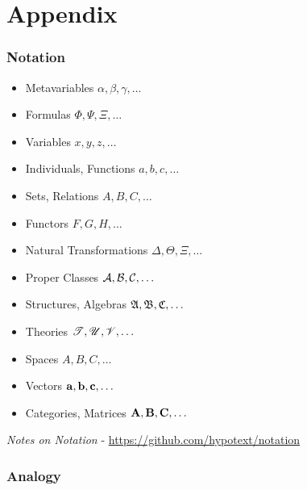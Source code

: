\part{Appendix}\label{part:appendix}

\section{Notation}\label{sec:notation}

\begin{itemize}
  \item Metavariables $\alpha, \beta, \gamma, \ldots$
  \item Formulas $\Phi, \Psi, \Xi, \ldots$
  \item Variables $x, y, z, \ldots$
  \item Individuals, Functions $a, b, c, \ldots$
  \item Sets, Relations $A, B, C, \ldots$
  \item Functors $F, G, H, \ldots$
  \item Natural Transformations $\Delta, \Theta, \Xi, \ldots$
  \item Proper Classes $\mathcal{A}, \mathcal{B}, \mathcal{C}, \ldots$
  \item Structures, Algebras $\mathfrak{A}, \mathfrak{B},
    \mathfrak{C}, \ldots$
  \item Theories $\mathscr{T}, \mathscr{U}, \mathscr{V}, \ldots$
  \item Spaces $\xspace{A}, \xspace{B}, \xspace{C}, \ldots$
  \item Vectors $\mathbf{a}, \mathbf{b}, \mathbf{c}, \ldots$
  \item Categories, Matrices $\mathbf{A}, \mathbf{B}, \mathbf{C}, \ldots$
\end{itemize}

\fist \emph{Notes on Notation} -  \url{https://github.com/hypotext/notation}



\section{Analogy}\label{sec:analogy}

